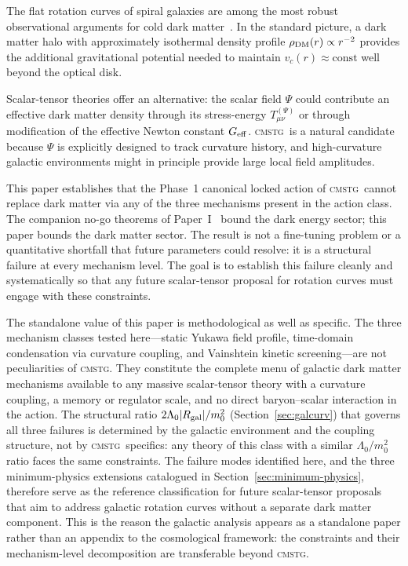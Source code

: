 \documentclass[12pt,a4paper]{article}
\newcommand{\CMSTG}{\textsc{cmstg}}
\newcommand{\Lz}{\Lambda_0}
\newcommand{\Geff}{G_{\rm eff}}
\theoremstyle{plain}
\begin{document}
The flat rotation curves of spiral galaxies are among the most robust
observational arguments for cold dark matter~\cite{Rubin1980,Begeman1991}.
In the standard picture, a dark matter halo with approximately isothermal
density profile $\rho_{\rm DM}(r) \propto r^{-2}$ provides the additional
gravitational potential needed to maintain $v_c(r) \approx \mathrm{const}$
well beyond the optical disk.

Scalar-tensor theories offer an alternative: the scalar field $\Psi$ could
contribute an effective dark matter density through its stress-energy
$T^{(\Psi)}_{\mu\nu}$ or through modification of the effective Newton
constant $\Geff$. \CMSTG\ is a natural candidate because $\Psi$ is
explicitly designed to track curvature history, and high-curvature galactic
environments might in principle provide large local field amplitudes.

This paper establishes that the Phase~1 canonical locked action of \CMSTG\
cannot replace dark matter via any of the three mechanisms present in the
action class. The companion no-go theorems of Paper~I~\cite{WilsonPaperI}
bound the dark energy sector; this paper bounds the dark matter sector. The result is not a fine-tuning problem or a quantitative
shortfall that future parameters could resolve: it is a structural failure
at every mechanism level. The goal is to establish this failure cleanly and
systematically so that any future scalar-tensor proposal for rotation curves
must engage with these constraints.

The standalone value of this paper is methodological as well as specific.
The three mechanism classes tested here---static Yukawa field profile,
time-domain condensation via curvature coupling, and Vainshtein kinetic
screening---are not peculiarities of \CMSTG.  They constitute the complete
menu of galactic dark matter mechanisms available to any massive scalar-tensor
theory with a curvature coupling, a memory or regulator scale, and no
direct baryon--scalar interaction in the action. The structural ratio
$2\Lz|R_{\rm gal}|/m_0^2$ (Section~\ref{sec:galcurv}) that governs all three
failures is determined by the galactic environment and the coupling structure,
not by \CMSTG\ specifics: any theory of this class with a similar $\Lz/m_0^2$
ratio faces the same constraints. The failure modes identified here, and the
three minimum-physics extensions catalogued in Section~\ref{sec:minimum-physics},
therefore serve as the reference classification for future scalar-tensor proposals
that aim to address galactic rotation curves without a separate dark matter
component. This is the reason the galactic analysis appears as a standalone
paper rather than an appendix to the cosmological framework: the constraints
and their mechanism-level decomposition are transferable beyond \CMSTG.
\end{document}
